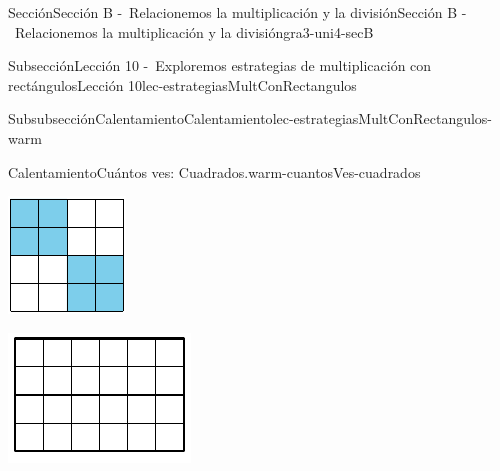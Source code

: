 \documentclass[twoside,10pt,]{article}
\begin{document}
\begin{sectionptx}{Sección}{Sección B -~Relacionemos la multiplicación y la división}{}{Sección B -~Relacionemos la multiplicación y la división}{}{}{gra3-uni4-secB}
\begin{subsectionptx}{Subsección}{Lección 10 -~Exploremos estrategias de multiplicación con rectángulos}{}{Lección 10}{}{}{lec-estrategiasMultConRectangulos}
\begin{subsubsectionptx}{Subsubsección}{Calentamiento}{}{Calentamiento}{}{}{lec-estrategiasMultConRectangulos-warm}
\begin{exploration}{Calentamiento}{Cuántos ves: Cuadrados.}{warm-cuantosVes-cuadrados}
\begin{sidebyside}{3}{0}{0}{0.05}
\begin{sbspanel}{0.3}%
\includegraphics[width=\linewidth]{external/svg-source/tikz-file-147481.pdf}
\end{sbspanel}%
\begin{sbspanel}{0.3}%
\includegraphics[width=\linewidth]{external/svg-source/tikz-file-141805.pdf}
\end{sbspanel}%
\begin{sbspanel}{0.3}%

\end{sbspanel}
\end{sidebyside}
\end{exploration}
\end{subsubsectionptx}
\end{subsectionptx}
\end{sectionptx}
\end{document}
